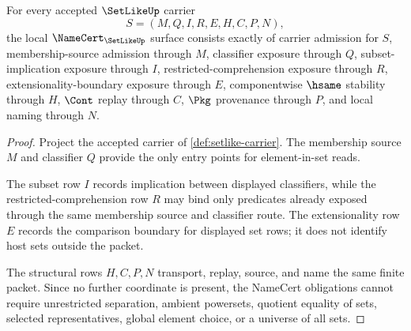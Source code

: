 \begin{theorem}
\label{thm:setlike-namecert-obligations}
For every accepted $\SetLikeUp$ carrier
$$
S=(M,Q,I,R,E,H,C,P,N),
$$
the local $\NameCert_{\SetLikeUp}$ surface consists exactly of carrier admission for $S$, membership-source admission through $M$, classifier exposure through $Q$, subset-implication exposure through $I$, restricted-comprehension exposure through $R$, extensionality-boundary exposure through $E$, componentwise $\hsame$ stability through $H$, $\Cont$ replay through $C$, $\Pkg$ provenance through $P$, and local naming through $N$.
\end{theorem}
\begin{proof}
Project the accepted carrier of \autoref{def:setlike-carrier}. The membership source $M$ and classifier $Q$ provide the only entry points for element-in-set reads.

The subset row $I$ records implication between displayed classifiers, while the restricted-comprehension row $R$ may bind only predicates already exposed through the same membership source and classifier route. The extensionality row $E$ records the comparison boundary for displayed set rows; it does not identify host sets outside the packet.

The structural rows $H,C,P,N$ transport, replay, source, and name the same finite packet. Since no further coordinate is present, the NameCert obligations cannot require unrestricted separation, ambient powersets, quotient equality of sets, selected representatives, global element choice, or a universe of all sets.
\end{proof}

